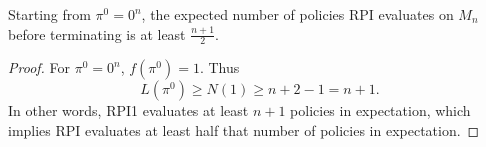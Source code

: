 \begin{appendices}
\begin{corollary}
	Starting from $\pi^0=0^n$, the expected number of policies RPI evaluates on $M_n$ before terminating is at least $\frac{n+1}{2}$.
\end{corollary}

\begin{proof}
For $\pi^0=0^{n}$, $f(\pi^0)=1$. Thus 
\begin{equation*}
L(\pi^0)\ge N(1)\ge n+2-1=n+1.
\end{equation*}
In other words, RPI1 evaluates at least $n + 1$ policies in expectation, which implies RPI evaluates at least half that number of policies in expectation.
\end{proof}

\end{appendices}

